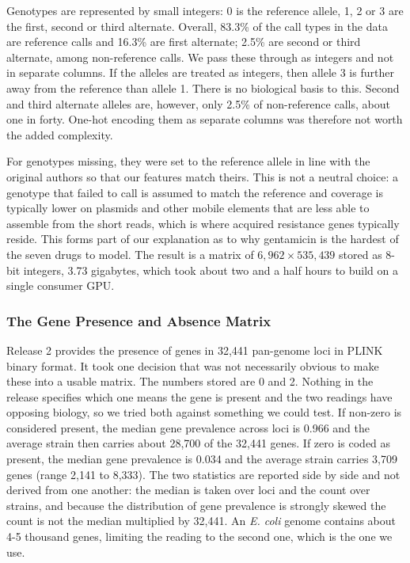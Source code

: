 \documentclass[journal]{IEEEtran}
\begin{document}
Genotypes are represented by small integers: 0 is the reference allele, 1, 2 or 3
are the first, second or third alternate. Overall, 83.3\% of the call types
in the data are reference calls and 16.3\% are first alternate; 2.5\%
are second or third alternate, among non-reference calls. We pass these through as
integers and not in separate columns. If the alleles are treated as integers, then
allele 3 is further away from the reference than allele 1. There is no biological
basis to this. Second and third alternate alleles are, however, only 2.5\% of
non-reference calls, about one in forty. One-hot encoding them as separate columns
was therefore not worth the added complexity.

For genotypes missing, they were set to the reference allele in line with the
original authors so that our features match theirs. This is not a neutral choice: a
genotype that failed to call is assumed to match the reference and coverage is
typically lower on plasmids and other mobile elements that are less able to
assemble from the short reads, which is where acquired resistance genes typically
reside. This forms part of our explanation as to why gentamicin is the hardest of
the seven drugs to model. The result is a matrix of $6{,}962 \times 535{,}439$
stored as 8-bit integers, 3.73 gigabytes, which took about two and a half hours to
build on a single consumer GPU.

\subsubsection{The Gene Presence and Absence Matrix}
Release 2 provides the presence of genes in 32,441 pan-genome loci in PLINK binary
format. It took one decision that was not necessarily obvious to make these into a
usable matrix. The numbers stored are 0 and 2. Nothing in the release specifies
which one means the gene is present and the two readings have opposing biology, so
we tried both against something we could test. If non-zero is considered present, the
median gene prevalence across loci is 0.966 and the average strain then carries about
28,700 of the 32,441 genes. If zero is coded as present, the median gene prevalence is
0.034 and the average strain carries 3,709 genes (range 2,141 to 8,333). The two
statistics are reported side by side and not derived from one another: the median is
taken over loci and the count over strains, and because the distribution of gene
prevalence is strongly skewed the count is not the median multiplied by 32,441. An
\textit{E. coli} genome contains about 4-5 thousand genes, limiting the reading to
the second one, which is the one we use.
\end{document}
